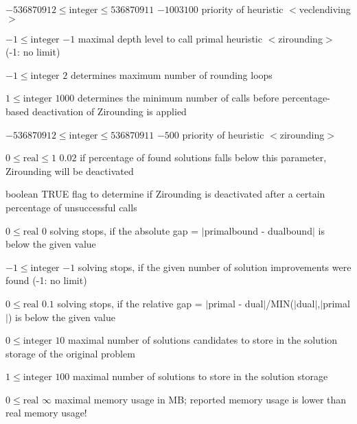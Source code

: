 %
{$-536870912\leq\textrm{integer}\leq536870911$}%
{$-1003100$}%
{priority of heuristic $<$veclendiving$>$}%
{}

%
{$-1\leq\textrm{integer}$}%
{$-1$}%
{maximal depth level to call primal heuristic $<$zirounding$>$ (-1: no limit)}%
{}

%
{$-1\leq\textrm{integer}$}%
{$2$}%
{determines maximum number of rounding loops}%
{}

%
{$1\leq\textrm{integer}$}%
{$1000$}%
{determines the minimum number of calls before percentage-based deactivation of Zirounding is applied}%
{}

%
{$-536870912\leq\textrm{integer}\leq536870911$}%
{$-500$}%
{priority of heuristic $<$zirounding$>$}%
{}

%
{$0\leq\textrm{real}\leq1$}%
{$0.02$}%
{if percentage of found solutions falls below this parameter, Zirounding will be deactivated}%
{}

%
{boolean}%
{TRUE}%
{flag to determine if Zirounding is deactivated after a certain percentage of unsuccessful calls}%
{}

%
{$0\leq\textrm{real}$}%
{$0$}%
{solving stops, if the absolute gap = $|$primalbound - dualbound$|$ is below the given value}%
{}

%
{$-1\leq\textrm{integer}$}%
{$-1$}%
{solving stops, if the given number of solution improvements were found (-1: no limit)}%
{}

%
{$0\leq\textrm{real}$}%
{$0.1$}%
{solving stops, if the relative gap = $|$primal - dual$|$/MIN($|$dual$|$,$|$primal$|$) is below the given value}%
{}

%
{$0\leq\textrm{integer}$}%
{$10$}%
{maximal number of solutions candidates to store in the solution storage of the original problem}%
{}

%
{$1\leq\textrm{integer}$}%
{$100$}%
{maximal number of solutions to store in the solution storage}%
{}

%
{$0\leq\textrm{real}$}%
{$\infty$}%
{maximal memory usage in MB; reported memory usage is lower than real memory usage!}%
{}

